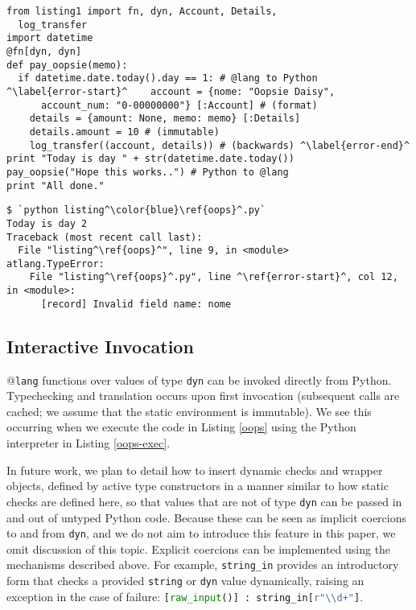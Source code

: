 \documentclass[9pt,preprint]{sigplanconf}
\newcommand{\lstinlinep}[1]{\lstinline[language=Python,basicstyle=\ttfamily\small]{#1}}
\begin{document}
\begin{codelisting}[t]
\begin{lstlisting}
from listing1 import fn, dyn, Account, Details, 
  log_transfer
import datetime
@fn[dyn, dyn]
def pay_oopsie(memo):
  if datetime.date.today().day == 1: # @lang to Python
^\label{error-start}^    account = {nome: "Oopsie Daisy", 
      account_num: "0-00000000"} [:Account] # (format)
    details = {amount: None, memo: memo} [:Details]
    details.amount = 10 # (immutable)
    log_transfer((account, details)) # (backwards) ^\label{error-end}^
print "Today is day " + str(datetime.date.today())
pay_oopsie("Hope this works..") # Python to @lang
print "All done."
\end{lstlisting}
\caption{[\texttt{listing\ref{oops}.py}] Lines \ref{error-start}-\ref{error-end} each have a type error.}
\label{oops}
\end{codelisting}
\begin{codelisting}[t]
\begin{lstlisting}[style=Bash]
$ `python listing^\color{blue}\ref{oops}^.py`
Today is day 2
Traceback (most recent call last):
  File "listing^\ref{oops}^", line 9, in <module>
atlang.TypeError: 
    File "listing^\ref{oops}^.py", line ^\ref{error-start}^, col 12, in <module>: 
      [record] Invalid field name: nome
\end{lstlisting}
\caption{Execution never proceeds into a function with a type error.}
\label{oops-exec}
\end{codelisting}

\subsection{Interactive Invocation} @\texttt{lang} functions over values of type \lstinlinep{dyn} can be invoked directly from Python. Typechecking and translation occurs upon first invocation (subsequent calls are cached; we assume that the static environment is immutable). We see this occurring when we execute the code in Listing \ref{oops} using the Python interpreter in Listing \ref{oops-exec}. 

In future work, we plan to detail how to insert dynamic checks and wrapper objects, defined by active type constructors in a manner similar to how static checks are defined here, so that values that are not of type \lstinlinep{dyn} can be passed in and out of untyped Python code. Because these can be seen as implicit coercions to and from \lstinlinep{dyn}, and we do not aim to introduce this feature in this paper, we omit discussion of this topic. Explicit coercions can be implemented using the mechanisms described above. For example, \lstinlinep{string_in} provides an introductory form that checks a provided \lstinlinep{string}  or \lstinlinep{dyn} value dynamically, raising an exception in the case of failure: \lstinlinep{[raw_input()] : string_in[r"\\d+"]}.
\end{document}
